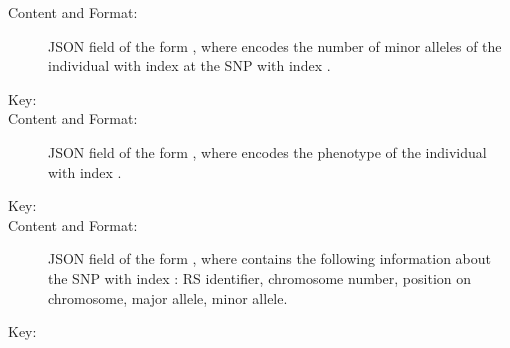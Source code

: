 \documentclass[a4paper,10pt,english]{sphinxhowto}
\begin{document}
\begin{description}
\begin{description}
\begin{description}
\item[{Content and Format:}] \leavevmode
JSON field of the form ,
where  encodes the number of minor alleles of the individual with index  at the SNP with index .

\end{description}

\item[{\sphinxcode{\sphinxupquote{\textless{}PHENOTYPE\_DATA\textgreater{}}}}] \leavevmode\begin{description}
\item[{Key:}] \leavevmode
{}

\item[{Content and Format:}] \leavevmode
JSON field of the form , where  encodes the phenotype of
the individual with index .

\end{description}

\item[{\sphinxcode{\sphinxupquote{\textless{}SNP\_DATA\textgreater{}}}}] \leavevmode\begin{description}
\item[{Key:}] \leavevmode
{}

\item[{Content and Format:}] \leavevmode
JSON field of the form , where  contains the following
information about the SNP with index : RS identifier, chromosome number, position on chromosome, major allele, minor allele.

\end{description}

\item[{\sphinxcode{\sphinxupquote{\textless{}DISEASE\_SNP\_DATA\textgreater{}}}}] \leavevmode\begin{description}
\item[{Key:}] \leavevmode
{}


\end{description}
\end{description}
\end{description}
\end{document}
